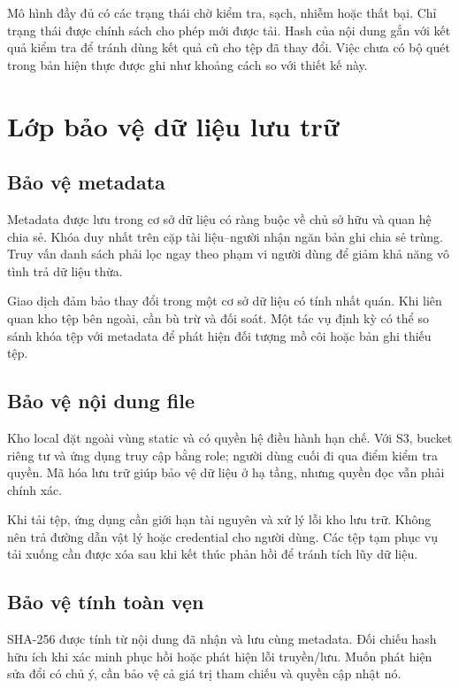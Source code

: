 Mô hình đầy đủ có các trạng thái chờ kiểm tra, sạch, nhiễm hoặc thất bại. Chỉ trạng thái được chính sách cho phép mới được tải. Hash của nội dung gắn với kết quả kiểm tra để tránh dùng kết quả cũ cho tệp đã thay đổi. Việc chưa có bộ quét trong bản hiện thực được ghi như khoảng cách so với thiết kế này.

\section{Lớp bảo vệ dữ liệu lưu trữ}
\subsection{Bảo vệ metadata}
Metadata được lưu trong cơ sở dữ liệu có ràng buộc về chủ sở hữu và quan hệ chia sẻ. Khóa duy nhất trên cặp tài liệu--người nhận ngăn bản ghi chia sẻ trùng. Truy vấn danh sách phải lọc ngay theo phạm vi người dùng để giảm khả năng vô tình trả dữ liệu thừa.

Giao dịch đảm bảo thay đổi trong một cơ sở dữ liệu có tính nhất quán. Khi liên quan kho tệp bên ngoài, cần bù trừ và đối soát. Một tác vụ định kỳ có thể so sánh khóa tệp với metadata để phát hiện đối tượng mồ côi hoặc bản ghi thiếu tệp.
\subsection{Bảo vệ nội dung file}
Kho local đặt ngoài vùng static và có quyền hệ điều hành hạn chế. Với S3, bucket riêng tư và ứng dụng truy cập bằng role; người dùng cuối đi qua điểm kiểm tra quyền. Mã hóa lưu trữ giúp bảo vệ dữ liệu ở hạ tầng, nhưng quyền đọc vẫn phải chính xác.

Khi tải tệp, ứng dụng cần giới hạn tài nguyên và xử lý lỗi kho lưu trữ. Không nên trả đường dẫn vật lý hoặc credential cho người dùng. Các tệp tạm phục vụ tải xuống cần được xóa sau khi kết thúc phản hồi để tránh tích lũy dữ liệu.
\subsection{Bảo vệ tính toàn vẹn}
SHA-256 được tính từ nội dung đã nhận và lưu cùng metadata. Đối chiếu hash hữu ích khi xác minh phục hồi hoặc phát hiện lỗi truyền/lưu. Muốn phát hiện sửa đổi có chủ ý, cần bảo vệ cả giá trị tham chiếu và quyền cập nhật nó.

